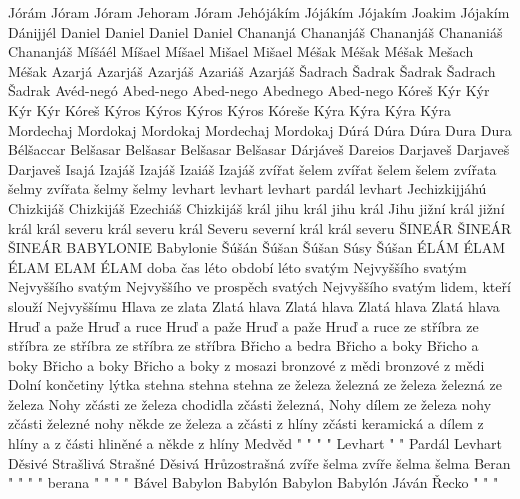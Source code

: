  {Jórám}     {Jóram}   {Jóram}   {Jehoram} {Jóram}   
  {Jehójákím} {Jójákím} {Jójakím} {Joakim}  {Jójakím} 
  {Dánijjél}  {Daniel}  {Daniel}  {Daniel}  {Daniel}   
 {Chananjá} {Chananjáš} {Chananjáš} {Chananiáš} {Chananjáš}   
 {Míšáél} {Míšael} {Míšael} {Mišael} {Mišael}    
 {Méšak} {Méšak} {Méšak} {Mešach} {Méšak}   
 {Azarjá} {Azarjáš} {Azarjáš} {Azariáš} {Azarjáš}   
 {Šadrach} {Šadrak} {Šadrak} {Šadrach} {Šadrak}   
 {Avéd-negó} {Abed-nego} {Abed-nego} {Abednego} {Abed-nego}    
 {Kóreš} {Kýr} {Kýr} {Kýr} {Kýr}   
 {Kóreš} {Kýros} {Kýros} {Kýros} {Kýros}   
 {Kóreše} {Kýra} {Kýra} {Kýra} {Kýra}   
 {Mordechaj} {Mordokaj} {Mordokaj} {Mordechaj} {Mordokaj}   
 {Dúrá} {Dúra} {Dúra} {Dura} {Dura}   
 {Bélšaccar} {Belšasar} {Belšasar} {Belšasar} {Belšasar}   
 {Dárjáveš} {Dareios} {Darjaveš} {Darjaveš} {Darjaveš}   
 {Isajá} {Izajáš} {Izajáš} {Izaiáš} {Izajáš}   
 {zvířat} {šelem} {zvířat} {šelem} {šelem}   
 {zvířata} {šelmy} {zvířata} {šelmy} {šelmy}   
 {levhart} {levhart} {levhart} {pardál} {levhart}   
 {Jechizkijjáhú} {Chizkijáš} {Chizkijáš} {Ezechiáš} {Chizkijáš}   
 {král jihu} {král jihu} {král Jihu} {jižní král} {jižní král}   
 {král severu} {král severu} {král Severu} {severní král} {král severu}   
 {ŠINEÁR} {ŠINEÁR} {ŠINEÁR} {BABYLONIE} {Babylonie}    
 {Šúšán} {Šúšan} {Šúšan} {Súsy} {Šúšan}   
 {ÉLÁM} {ÉLAM} {ÉLAM} {ELAM} {ÉLAM}    
 {doba} {čas} {léto} {období} {léto}     
 {svatým Nejvyššího} {svatým Nejvyššího} {svatým Nejvyššího} {ve prospěch svatých Nejvyššího}  {svatým lidem, kteří slouží Nejvyššímu}    
 {Hlava ze zlata} {Zlatá hlava} {Zlatá hlava} {Zlatá hlava} {Zlatá hlava}   
 {Hruď a paže} {Hruď a ruce} {Hruď a paže} {Hruď a paže} {Hruď a ruce}   
 {ze stříbra} {ze stříbra} {ze stříbra} {ze stříbra} {ze stříbra}   
 {Břicho a bedra} {Břicho a boky} {Břicho a boky} {Břicho a boky} {Břicho a boky}   
 {z mosazi} {bronzové} {z mědi} {bronzové} {z mědi}   
 {Dolní končetiny} {lýtka} {stehna} {stehna} {stehna}   
 {ze železa} {železná} {ze železa} {železná} {ze železa}   
 {Nohy zčásti ze železa} {chodidla zčásti železná,} {Nohy dílem ze železa} {nohy zčásti železné} {nohy někde ze železa}   
 {a zčásti z hlíny} {zčásti keramická} {a dílem z hlíny} {a z části hliněné} {a někde z hlíny}   
 {Medvěd} {"} {"} {"} {"}   
 {Levhart} {"} {"} {Pardál} {Levhart}   
 {Děsivé} {Strašlivá} {Strašné} {Děsivá} {Hrůzostrašná}   
 {zvíře} {šelma} {zvíře} {šelma} {šelma}   
 {Beran} {"} {"} {"} {"}   
 {berana} {"} {"} {"} {"}   
 {Bável} {Babylon} {Babylón} {Babylon} {Babylón}   
 {Jáván} {Řecko} {"} {"} {"}   


